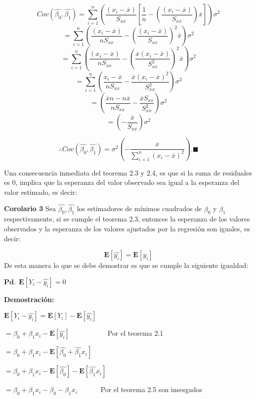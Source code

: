 \documentclass[a4paper,oneside,openany]{book}
\begin{document}
\[Cov\left(\hat{\beta_{0}},\hat{\beta_{1}}\right)=\sum_{i=1}^{n}\left(\frac{(x_{i}-\overline{x})}{S_{xx}}\left[\frac{1}{n}-\left(\frac{(x_{i}-\overline{x})}{S_{xx}}\right)\overline{x}\right]\right)\sigma^2\]
\[=\sum_{i=1}^{n}\left(\frac{(x_{i}-\overline{x})}{nS_{xx}}-\left(\frac{(x_{i}-\overline{x})}{S_{xx}}\right)^2\overline{x}\right)\sigma^2\]
\[=\sum_{i=1}^{n}\left(\frac{(x_{i}-\overline{x})}{nS_{xx}}-\left(\frac{\overline{x}(x_{i}-\overline{x})}{S^2_{xx}}\right)^2\overline{x}\right)\sigma^2\]
\[=\sum_{i=1}^{n}\left(\frac{x_{i}-\overline{x}}{nS_{xx}}-\frac{\overline{x}(x_{i}-\overline{x})^2}{S^2_{xx}}\right)\sigma^2\]
\[=\left(\frac{\overline{x}n -n\overline{x}}{nS_{xx}}-\frac{\overline{x}S_{xx}}{S^2_{xx}}\right)\sigma^2\]
\[=\left(-\frac{\overline{x}}{S_{xx}}\right)\sigma^2\]

\[\therefore Cov\left(\hat{\beta_{0}},\hat{\beta_{1}}\right)=\sigma^2\left(-\frac{\overline{x}}{\sum_{i=1}^{n}(x_{i}-\overline{x})^2}\right).\blacksquare\]

Una consecuencia inmediata del teorema 2.3 y 2.4, es que si la suma de
residuales es 0, implica que la esperanza del valor observado sea igual
a la esperanza del valor estimado, es decir:

\textbf{Corolario 3} Sea \(\hat{\beta_{0}},\hat{\beta_{1}}\) los
estimadores de mínimos cuadrados de \(\beta_{0}\) y \(\beta_{1}\)
respectivamente, si se cumple el teorema 2.3, entonces la esperanza de
los valores observados y la esperanza de los valores ajustados por la
regresión son iguales, es decir:

\[\mathbf{E}\left[\hat{y_{i}}\right]=\mathbf{E}\left[ y_{i} \right]\] De
esta manera lo que se debe demostrar es que se cumple la siguiente
igualdad:

\(\mathbf{Pd.} \ \ \mathbf{E}\left[ Y_{i}-\hat{y_{i}}\right]=0\)

\textbf{Demostración:}

\(\mathbf{E}\left[ Y_{i}-\hat{y_{i}}\right]=\mathbf{E}\left[ Y_{i}\right]-\mathbf{E}\left[\hat{y_{i}}\right]\)

\(=\beta_{0}+\beta_{1}x_{i}-\mathbf{E}\left[\hat{y_{i}}\right]\) ~~~ ~~~
~~~Por el teorema 2.1

\(=\beta_{0}+\beta_{1}x_{i}-\mathbf{E}\left[ \hat{\beta_{0}}+\hat{\beta_{1}}x_{i}\right]\)

\(=\beta_{0}+\beta_{1}x_{i}-\mathbf{E}\left[ \hat{\beta_{0}}\right]-\mathbf{E}\left[\hat{\beta_{1}}x_{i}\right]\)

\(=\beta_{0}+\beta_{1}x_{i}-\beta_{0}-\beta_{1}x_{i}\) ~~~~~~Por el
teorema 2.5 son insesgados
\end{document}
